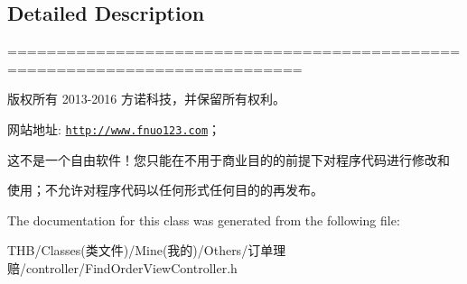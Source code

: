 \subsection{Detailed Description}
============================================================================

版权所有 2013-\/2016 方诺科技，并保留所有权利。

网站地址\+: \href{http://www.fnuo123.com}{\tt http\+://www.\+fnuo123.\+com}； 



这不是一个自由软件！您只能在不用于商业目的的前提下对程序代码进行修改和

使用；不允许对程序代码以任何形式任何目的的再发布。 

 

The documentation for this class was generated from the following file\+:\begin{DoxyCompactItemize}
\item 
T\+H\+B/\+Classes(类文件)/\+Mine(我的)/\+Others/订单理赔/controller/Find\+Order\+View\+Controller.\+h\end{DoxyCompactItemize}
